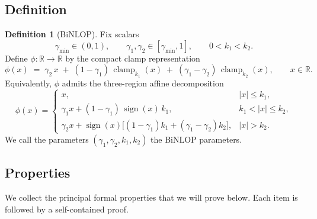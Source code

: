 \documentclass[11pt, twoside, openright, english]{article}
\DeclareMathOperator{\clamp}{clamp}
\DeclareMathOperator{\sign}{sign}
\newcommand{\R}{\mathbb{R}}
\numberwithin{equation}{section}
\theoremstyle{plain}
\theoremstyle{definition}
\newtheorem{definition}[theorem]{Definition}
\theoremstyle{remark}
\begin{document}
\subsection{Definition}
\label{subsec:def}
\begin{definition}[BiNLOP]
Fix scalars
\[
\gamma_{\min}\in(0,1),\qquad \gamma_1,\gamma_2\in[\gamma_{\min},1],\qquad 0<k_1<k_2.
\]
Define $\phi:\R\to\R$ by the compact clamp representation
\begin{equation}\label{eq:phi-clamp-rep}
\phi(x) \;=\; \gamma_2\,x \;+\; (1-\gamma_1)\,\clamp_{k_1}(x) \;+\; (\gamma_1-\gamma_2)\,\clamp_{k_2}(x),\qquad x\in\R.
\end{equation}
Equivalently, $\phi$ admits the three-region affine decomposition
\begin{equation}\label{eq:phi-regions-rep}
\phi(x)=
\begin{cases}
x, & |x|\le k_1,\\[6pt]
\gamma_1 x + (1-\gamma_1)\,\sign(x)\,k_1, & k_1<|x|\le k_2,\\[8pt]
\gamma_2 x + \sign(x)\big[(1-\gamma_1)k_1 + (\gamma_1-\gamma_2)k_2\big], & |x|>k_2.
\end{cases}
\end{equation}
We call the parameters $(\gamma_1,\gamma_2,k_1,k_2)$ the BiNLOP parameters.
\end{definition}

\subsection{Properties}
We collect the principal formal properties that we will prove below. Each item is followed by a self-contained proof.
\end{document}
